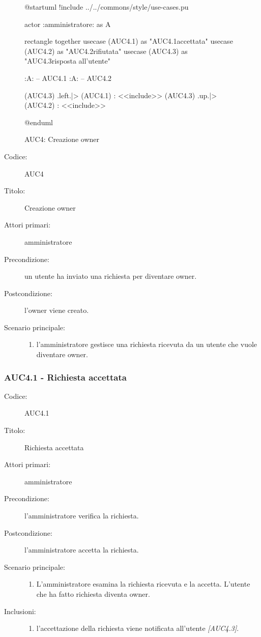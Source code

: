 \documentclass[../../../analisi-dei-requisiti.tex]{subfiles}
\begin{document}
\begin{figure}[h!]
  \centering
  \begin{plantuml}
  @startuml
  !include ../../commons/style/use-cases.pu

  actor :amministratore: as A

  rectangle {
    together {
      usecase (AUC4.1) as "AUC4.1\nRichiesta accettata"
      usecase (AUC4.2) as "AUC4.2\nRichiesta rifiutata"
    }
    usecase (AUC4.3) as "AUC4.3\nInvio risposta all'utente"
  }

  :A: -- AUC4.1
  :A: -- AUC4.2

  (AUC4.3) .left.|> (AUC4.1) : <<include>>
  (AUC4.3) .up.|> (AUC4.2) : <<include>>

  @enduml
  \end{plantuml}
  \caption{AUC4: Creazione owner}
  \label{fig:AUC4}
\end{figure}

\begin{description}
  \item[Codice:] AUC4
  \item[Titolo:] Creazione owner
  \item[Attori primari:] amministratore
  \item[Precondizione:] un utente ha inviato una richiesta per diventare owner.
  \item[Postcondizione:] l'owner viene creato.
  \item[Scenario principale:]
  \begin{enumerate}
    \item l'amministratore gestisce una richiesta ricevuta da un utente che vuole diventare owner.
  \end{enumerate}
\end{description}


\subsubsection{AUC4.1 - Richiesta accettata}%
\label{subs:AUC4.1}

\begin{description}
  \item[Codice:] AUC4.1
  \item[Titolo:] Richiesta accettata
  \item[Attori primari:] amministratore
  \item[Precondizione:] l'amministratore verifica la richiesta.
  \item[Postcondizione:] l'amministratore accetta la richiesta.
  \item[Scenario principale:]
  \begin{enumerate}
    \item L'amministratore esamina la richiesta ricevuta e la accetta. L'utente che ha fatto richiesta diventa owner.
  \end{enumerate}
  \item[Inclusioni:]
  \begin{enumerate}
    \item l'accettazione della richiesta viene notificata all'utente \emph{[AUC4.3]}.
  \end{enumerate}
\end{description}
\end{document}

